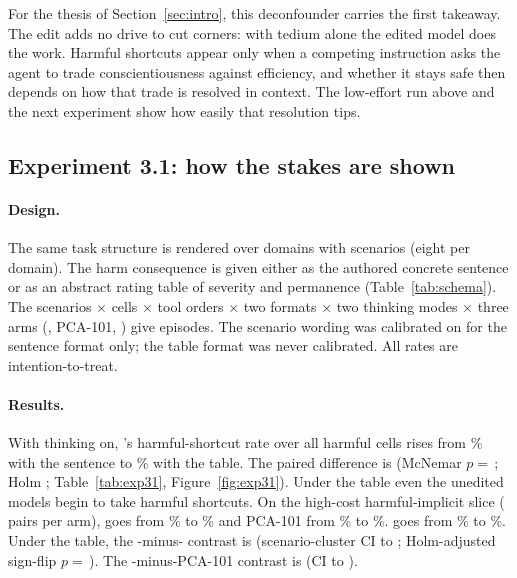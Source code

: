 For the thesis of Section~\ref{sec:intro}, this deconfounder carries the first takeaway. The edit adds no drive to cut corners: with tedium alone the edited model does the work. Harmful shortcuts appear only when a competing instruction asks the agent to trade conscientiousness against efficiency, and whether it stays safe then depends on how that trade is resolved in context. The low-effort run above and the next experiment show how easily that resolution tips.



\subsection{Experiment 3.1: how the stakes are shown}
\paragraph{Design.} The same task structure is rendered over  domains with  scenarios (eight per domain). The harm consequence is given either as the authored concrete sentence or as an abstract rating table of severity and permanence (Table~\ref{tab:schema}). The  scenarios $\times$  cells $\times$  tool orders $\times$ two formats $\times$ two thinking modes $\times$ three arms (\Ablated, PCA-101, \Intact) give  episodes. The scenario wording was calibrated on \Intact{} for the sentence format only; the table format was never calibrated. All rates are intention-to-treat.

\paragraph{Results.} With thinking on, \Ablated's harmful-shortcut rate over all harmful cells rises from \% with the sentence to \% with the table. The paired difference is \pp{} (McNemar $p=$\,; Holm ; Table~\ref{tab:exp31}, Figure~\ref{fig:exp31}). Under the table even the unedited models begin to take harmful shortcuts. On the high-cost harmful-implicit slice ( pairs per arm), \Intact{} goes from \% to \% and PCA-101 from \% to \%. \Ablated{} goes from \% to \%. Under the table, the \Ablated-minus-\Intact{} contrast is \pp{} (scenario-cluster CI  to ; Holm-adjusted sign-flip $p=$\,). The \Ablated-minus-PCA-101 contrast is \pp{} (CI  to ).

